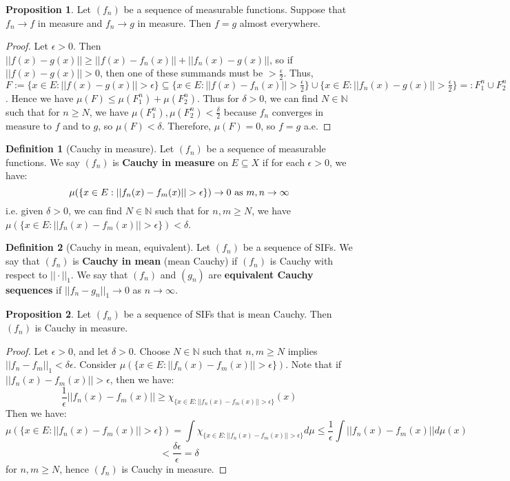 \documentclass[11pt, oneside]{amsart}   	%
\theoremstyle{definition}
\newtheorem{definition}{Definition}[section]
\newtheorem{prop}{Proposition}[section]
\begin{document}
	\begin{prop}
		Let $(f_n)$ be a sequence of measurable functions. Suppose that $f_n\rightarrow f$ in measure and $f_n\rightarrow 
		g$ in measure. Then $f = g$ almost everywhere.
	\end{prop}
	
	\begin{proof}
		Let $\epsilon > 0$. Then $||f(x) - g(x)||\geq ||f(x) - f_n(x)|| + ||f_n(x) - g(x)||$, so if $||f(x) - g(x)|| > 0$, then one of 
		these summands must be $> \frac{\epsilon}{2}$. Thus, $F := \{x\in E : ||f(x) - g(x)|| > \epsilon\}\subseteq\{x\in E : 
		||f(x) -  f_n(x)|| > \frac{\epsilon}{2}\}\cup\{x\in E : ||f_n(x) - g(x)|| > \frac{\epsilon}{2}\} =: F_1^n\cup F_2^n$. Hence we 
		have $\mu(F)\leq\mu(F_1^n) + \mu(F_2^n)$. Thus for $\delta > 0$, we can find $N\in\mathbb N$ such that for $n
		\geq N$, we have $\mu(F_1^n), \mu(F_2^n) < \frac{\delta}{2}$ because $f_n$ converges in measure to $f$ and to 
		$g$, so $\mu(F) < \delta$. Therefore, $\mu(F) = 0$, so $f = g$ a.e.
	\end{proof}
	
	\begin{definition}[Cauchy in measure]
		Let $(f_n)$ be a sequence of measurable functions. We say $(f_n)$ is \textbf{Cauchy in measure} on $E\subseteq 
		X$ if for each $\epsilon > 0$, we have:
		$$
			\mu(\{x\in E : ||f_n(x) - f_m(x)|| > \epsilon\})\rightarrow 0\textnormal{ as } m, n\rightarrow\infty
		$$
		i.e. given $\delta > 0$, we can find $N\in\mathbb N$ such that for $n, m\geq N$, we have $\mu(\{x\in E : ||f_n(x) 
		- f_m(x)|| > \epsilon\}) < \delta$. 
	\end{definition}
	
	\begin{definition}[Cauchy in mean, equivalent]
		Let $(f_n)$ be a sequence of SIFs. We say that $(f_n)$ is \textbf{Cauchy in mean} (mean Cauchy) if $(f_n)$ is 
		Cauchy with respect to $||\cdot||_1$. We say that $(f_n)$ and $(g_n)$ are \textbf{equivalent Cauchy sequences} 
		if $||f_n - g_n||_1\rightarrow 0$ as $n\rightarrow\infty$. 
	\end{definition}
	
	\begin{prop}
		Let $(f_n)$ be a sequence of SIFs that is mean Cauchy. Then $(f_n)$ is Cauchy in measure. 
	\end{prop}
	
	\begin{proof}
		Let $\epsilon > 0$, and let $\delta > 0$. Choose $N\in\mathbb N$ such that $n, m\geq N$ implies $||f_n - f_m||_1 < 
		\delta\epsilon$. Consider $\mu(\{x\in E : ||f_n(x) - f_m(x)|| > \epsilon\})$. Note that if $||f_n(x) - f_m(x)|| > \epsilon$, 
		then we have:
		$$
			\frac{1}{\epsilon}||f_n(x) - f_m(x)|| \geq\chi_{\{x\in E : ||f_n(x) - f_m(x)|| > \epsilon\}}(x)
		$$
		Then we have:
		$$
			\mu({\{x\in E : ||f_n(x) - f_m(x)|| > \epsilon\}}) = \int \chi_{\{x\in E : ||f_n(x) - f_m(x)|| > \epsilon\}}d\mu
			\leq\frac{1}{\epsilon}\int||f_n(x) - f_m(x)||d\mu(x)
		$$
		$$
			 < \frac{\delta\epsilon}{\epsilon} = \delta
		$$
		for $n, m\geq N$, hence $(f_n)$ is Cauchy in measure.
	\end{proof}
	
\end{document}
